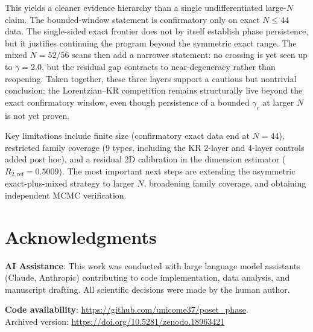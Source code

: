 \documentclass[11pt,a4paper]{article}
\begin{document}
This yields a cleaner evidence hierarchy than a single undifferentiated large-$N$ claim. The bounded-window statement is confirmatory only on exact $N \leq 44$ data. The single-sided exact frontier does not by itself establish phase persistence, but it justifies continuing the program beyond the symmetric exact range. The mixed $N = 52/56$ scans then add a narrower statement: no crossing is yet seen up to $\gamma = 2.0$, but the residual gap contracts to near-degeneracy rather than reopening. Taken together, these three layers support a cautious but nontrivial conclusion: the Lorentzian--KR competition remains structurally live beyond the exact confirmatory window, even though persistence of a bounded $\gamma_c$ at larger $N$ is not yet proven.

Key limitations include finite size (confirmatory exact data end at $N = 44$), restricted family coverage (9 types, including the KR 2-layer and 4-layer controls added post hoc), and a residual 2D calibration in the dimension estimator ($R_{2,\text{ref}} = 0.5009$). The most important next steps are extending the asymmetric exact-plus-mixed strategy to larger $N$, broadening family coverage, and obtaining independent MCMC verification.

\section*{Acknowledgments}
\textbf{AI Assistance}: This work was conducted with large language model assistants (Claude, Anthropic) contributing to code implementation, data analysis, and manuscript drafting. All scientific decisions were made by the human author.

\textbf{Code availability}: \url{https://github.com/unicome37/poset_phase}.\\
Archived version: \url{https://doi.org/10.5281/zenodo.18963421}
\end{document}
